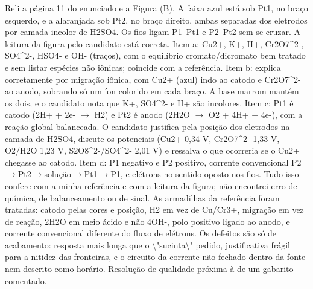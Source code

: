 \documentclass{article}%
\begin{document}
Reli a página 11 do enunciado e a Figura (B). A faixa azul está sob Pt1, no braço esquerdo, e a alaranjada sob Pt2, no braço direito, ambas separadas dos eletrodos por camada incolor de H2SO4. Os fios ligam P1--Pt1 e P2--Pt2 sem se cruzar. A leitura da figura pelo candidato está correta. Item a: Cu2+, K+, H+, Cr2O7\^{}2{-}, SO4\^{}2{-}, HSO4{-} e OH{-} (traços), com o equilíbrio cromato/dicromato bem tratado e sem listar espécies não iônicas; coincide com a referência. Item b: explica corretamente por migração iônica, com Cu2+ (azul) indo ao catodo e Cr2O7\^{}2{-} ao anodo, sobrando só um íon colorido em cada braço. A base marrom mantém os dois, e o candidato nota que K+, SO4\^{}2{-} e H+ são incolores. Item c: Pt1 é catodo (2H+ + 2e{-} $\to$ H2) e Pt2 é anodo (2H2O $\to$ O2 + 4H+ + 4e{-}), com a reação global balanceada. O candidato justifica pela posição dos eletrodos na camada de H2SO4, discute os potenciais (Cu2+ 0,34 V, Cr2O7\^{}2{-} 1,33 V, O2/H2O 1,23 V, S2O8\^{}2{-}/SO4\^{}2{-} 2,01 V) e ressalva o que ocorreria se o Cu2+ chegasse ao catodo. Item d: P1 negativo e P2 positivo, corrente convencional P2$\to$Pt2$\to$solução$\to$Pt1$\to$P1, e elétrons no sentido oposto nos fios. Tudo isso confere com a minha referência e com a leitura da figura; não encontrei erro de química, de balanceamento ou de sinal. As armadilhas da referência foram tratadas: catodo pelas cores e posição, H2 em vez de Cu/Cr3+, migração em vez de reação, 2H2O em meio ácido e não 4OH{-}, polo positivo ligado ao anodo, e corrente convencional diferente do fluxo de elétrons. Os defeitos são só de acabamento: resposta mais longa que o \textbackslash{}"sucinta\textbackslash{}" pedido, justificativa frágil para a nitidez das fronteiras, e o circuito da corrente não fechado dentro da fonte nem descrito como horário. Resolução de qualidade próxima à de um gabarito comentado.%
\end{document}
